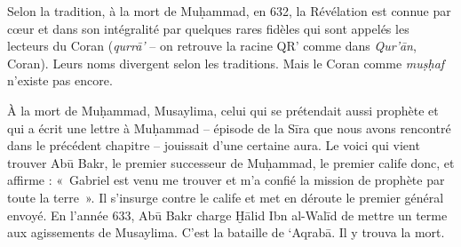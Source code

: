 Selon la tradition, à la mort de Muḥammad, en 632, la Révélation est
connue par cœur et dans son intégralité par quelques rares fidèles qui
sont appelés les lecteurs du Coran (\emph{qurrā'} -- on retrouve la
racine QR' comme dans \emph{Qur'ān}, Coran). Leurs noms divergent selon
les traditions. Mais le Coran comme \emph{muṣḥaf} n'existe pas encore.

À la mort de Muḥammad, Musaylima, celui qui se prétendait aussi prophète
et qui a écrit une lettre à Muḥammad -- épisode de la Sīra que nous
avons rencontré dans le précédent chapitre -- jouissait d'une certaine
aura. Le voici qui vient trouver Abū Bakr, le premier successeur de
Muḥammad, le premier calife donc, et affirme : «~Gabriel est venu me
trouver et m'a confié la mission de prophète par toute la terre~». Il
s'insurge contre le calife et met en déroute le premier général envoyé.
En l'année 633, Abū Bakr charge Ḫālid Ibn al-Walīd de mettre un terme
aux agissements de Musaylima. C'est la bataille de `Aqrabā. Il y trouva
la mort.

